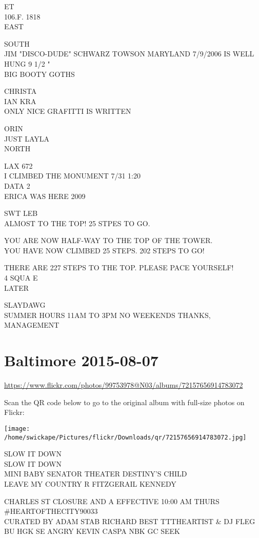 \documentclass[10pt,letterpaper]{article}
\begin{document}
ET\\
106.F. 1818\\
EAST

SOUTH\\
JIM "DISCO{-}DUDE" SCHWARZ TOWSON MARYLAND 7/9/2006 IS WELL HUNG 9 1/2 "\\
BIG BOOTY GOTHS

CHRISTA\\
IAN KRA\\
ONLY NICE GRAFITTI IS WRITTEN

ORIN\\
JUST LAYLA\\
NORTH

LAX 672\\
I CLIMBED THE MONUMENT 7/31 1:20\\
DATA 2\\
ERICA WAS HERE 2009

SWT LEB\\
ALMOST TO THE TOP!  25 STPES TO GO.

YOU ARE NOW HALF{-}WAY TO THE TOP OF THE TOWER.\\
YOU HAVE NOW CLIMBED 25 STEPS.  202 STEPS TO GO!

THERE ARE 227 STEPS TO THE TOP.  PLEASE PACE YOURSELF!\\
4 SQUA E\\
LATER

SLAYDAWG\\
SUMMER HOURS 11AM TO 3PM NO WEEKENDS THANKS, MANAGEMENT


\section*{Baltimore 2015-08-07}

\url{https://www.flickr.com/photos/99753978@N03/albums/72157656914783072}

Scan the QR code below to go to the original album with full-size photos on Flickr:

\texttt{[image: /home/swickape/Pictures/flickr/Downloads/qr/72157656914783072.jpg]}


SLOW IT DOWN\\
SLOW IT DOWN\\
MINI BABY SENATOR THEATER DESTINY'S CHILD\\
LEAVE MY COUNTRY R FITZGERAIL KENNEDY

CHARLES ST CLOSURE AND A EFFECTIVE 10:00 AM THURS\\
\#HEARTOFTHECITY90033\\
CURATED BY ADAM STAB RICHARD BEST TTTHEARTIST \& DJ FLEG\\
BU HGK SE ANGRY KEVIN CASPA NBK GC SEEK
\end{document}
